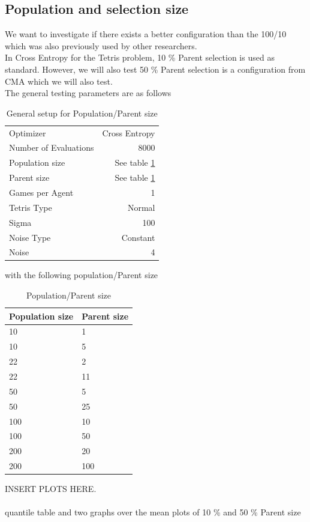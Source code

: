 \clearpage

\subsection{Population and selection size}
We want to investigate if there exists a better configuration than the 100/10 which was also previously used by other researchers.\\
In Cross Entropy for the Tetris problem, 10 \% Parent selection is used as standard. However, we will also test 50 \% Parent selection is a configuration from CMA which we will also test.\\
The general testing parameters are as follows
\begin{table}[h]
\centering
\caption{General setup for Population/Parent size}
\begin{tabular}{l r}
Optimizer & Cross Entropy\\
Number of Evaluations & 8000\\
Population size & See table \ref{CEPopulationParentSize}\\
Parent size & See table \ref{CEPopulationParentSize}\\
Games per Agent & 1\\
Tetris Type & Normal\\
\hline
Sigma & 100\\
Noise Type & Constant\\
Noise & 4
\end{tabular}
\end{table}

with the following population/Parent size

\begin{table}[h]
\centering
\caption{Population/Parent size \label{CEPopulationParentSize}}
\begin{tabular}{l l}
Population size & Parent size\\
\hline
10 & 1\\
10 & 5\\
22 & 2\\
22 & 11\\
50 & 5\\
50 & 25\\
100 & 10\\
100 & 50\\
200 & 20\\
200 & 100
\end{tabular}
\end{table}

INSERT PLOTS HERE.\\
\\
quantile table and two graphs over the mean plots of 10 \% and 50 \% Parent size


